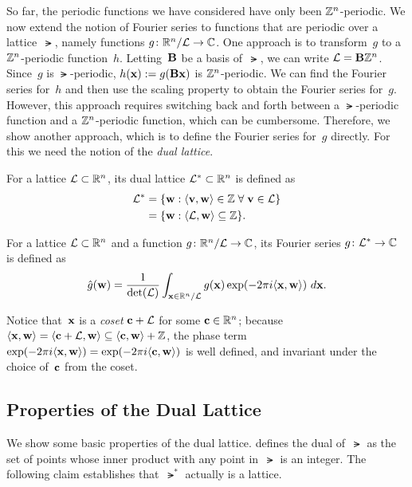 \documentclass[11pt]{article}
\begin{document}
So far, the periodic functions we have considered have only been
$\mathbb{Z}^n$-periodic. We now extend the notion of Fourier series to
functions that are periodic over a lattice~$\lat$, namely functions
$g \colon \mathbb{R}^n/ \mathcal{L} \to \mathbb{C}$. One approach is to transform~$g$ to a
$\mathbb{Z}^n$-periodic function~$h$. Letting~$\mathbf{B}$ be a basis of~$\lat$, we
can write $\mathcal{L} = \mathbf{B} \mathbb{Z}^n$. Since~$g$ is $\lat$-periodic,
$h(\mathbf{x}) := g(\mathbf{B} \mathbf{x})$ is $\mathbb{Z}^n$-periodic. We can find the
Fourier series for~$h$ and then use the scaling property to obtain the
Fourier series for~$g$. However, this approach requires switching back
and forth between a $\lat$-periodic function and a $\mathbb{Z}^n$-periodic
function, which can be cumbersome. Therefore, we show another
approach, which is to define the Fourier series for~$g$ directly. For
this we need the notion of the \emph{dual lattice}.

\begin{definition}
  \label{def:dual-lattice}
  For a lattice $\mathcal{L} \subset \mathbb{R}^{n}$, its dual lattice $\mathcal{L}^{*}
  \subset \mathbb{R}^{n}$ is defined as
  \begin{align*}
    \mathcal{L}^{*}
    &= \{ \mathbf{w} : \langle\mathbf{v},\mathbf{w}\rangle \in \mathbb{Z} \; \forall\;
      \mathbf{v} \in \mathcal{L}\} \\
    &= \{ \mathbf{w} : \langle\mathcal{L},\mathbf{w}\rangle \subseteq \mathbb{Z}\} .
  \end{align*}
\end{definition}

\begin{definition}
  For a lattice $\mathcal{L} \subset \mathbb{R}^{n}$ and a function
  $g \colon \mathbb{R}^n/\mathcal{L} \to \mathbb{C}$, its Fourier series $g \colon \mathcal{L}^{*}
  \to \mathbb{C}$ is defined as
  \[ \hat{g}(\mathbf{w}) = \frac{1}{\det(\mathcal{L})} \int_{\mathbf{x} \in \mathbb{R}^n /
      \mathcal{L}} g(\mathbf{x}) \exp(-2 \pi i \langle\mathbf{x},\mathbf{w}\rangle )\ d\mathbf{x} .\]
\end{definition}
Notice that~$\mathbf{x}$ is a \emph{coset} $\mathbf{c}+\mathcal{L}$ for some
$\mathbf{c} \in \mathbb{R}^{n}$; because
$\langle\mathbf{x},\mathbf{w}\rangle = \langle\mathbf{c}+\mathcal{L},\mathbf{w}\rangle \subseteq
\langle\mathbf{c},\mathbf{w}\rangle + \mathbb{Z}$, the phase term
$\exp(-2 \pi i \langle\mathbf{x},\mathbf{w}\rangle) = \exp(-2 \pi i \langle\mathbf{c},
  \mathbf{w}\rangle)$ is well defined, and invariant under the choice of~$\mathbf{c}$
from the coset.

\subsection{Properties of the Dual Lattice}

We show some basic properties of the dual lattice.
 defines the dual of~$\lat$ as the set of
points whose inner product with any point in~$\lat$ is an integer. The
following claim establishes that~$\lat^*$ actually is a lattice.
\end{document}
